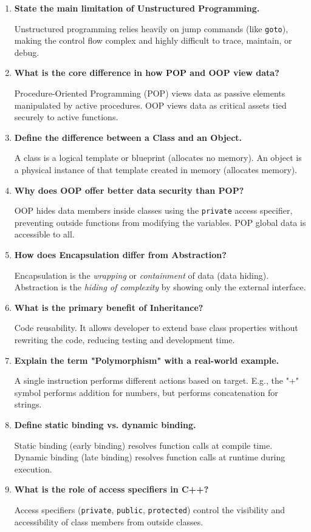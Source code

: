 \documentclass[12pt,a4paper]{article}
\newcommand{\Q}[1]{\textbf{#1}\par\noindent\ignorespaces}
\begin{document}
\begin{tcolorbox}[exambox, title={\textbf{Frequently Asked / Viva Questions}}]
\begin{enumerate}[topsep=0pt, label=\textbf{Q\arabic*.}, itemsep=5pt]
  \item \Q{State the main limitation of Unstructured Programming.}
    Unstructured programming relies heavily on jump commands (like \texttt{goto}), making the control flow complex and highly difficult to trace, maintain, or debug.
  \item \Q{What is the core difference in how POP and OOP view data?}
    Procedure-Oriented Programming (POP) views data as passive elements manipulated by active procedures. OOP views data as critical assets tied securely to active functions.
  \item \Q{Define the difference between a Class and an Object.}
    A class is a logical template or blueprint (allocates no memory). An object is a physical instance of that template created in memory (allocates memory).
  \item \Q{Why does OOP offer better data security than POP?}
    OOP hides data members inside classes using the \texttt{private} access specifier, preventing outside functions from modifying the variables. POP global data is accessible to all.
  \item \Q{How does Encapsulation differ from Abstraction?}
    Encapsulation is the \textit{wrapping} or \textit{containment} of data (data hiding). Abstraction is the \textit{hiding of complexity} by showing only the external interface.
  \item \Q{What is the primary benefit of Inheritance?}
    Code reusability. It allows developer to extend base class properties without rewriting the code, reducing testing and development time.
  \item \Q{Explain the term "Polymorphism" with a real-world example.}
    A single instruction performs different actions based on target. E.g., the "+" symbol performs addition for numbers, but performs concatenation for strings.
  \item \Q{Define static binding vs. dynamic binding.}
    Static binding (early binding) resolves function calls at compile time. Dynamic binding (late binding) resolves function calls at runtime during execution.
  \item \Q{What is the role of access specifiers in C++?}
    Access specifiers (\texttt{private}, \texttt{public}, \texttt{protected}) control the visibility and accessibility of class members from outside classes.

\end{enumerate}
\end{tcolorbox}
\end{document}
